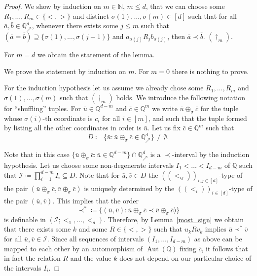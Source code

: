 \documentclass{amsart}
\theoremstyle{definition}
\theoremstyle{remark}
\numberwithin{equation}{section}
\newcommand{\aut}{\operatorname{Aut}}
\newcommand\qup[1]{\mathbb{Q}_\nearrow^{#1}}
\newcommand{\shuff}{\oplus}
\begin{document}
\begin{proof}
	We show by induction on $m \in {\mathbb N}$, $m \leq d$, that we can choose some $R_1,\dots,R_m \in \{<,>\}$ and distinct $\sigma(1),\dots,\sigma(m) \in [d]$ such that for all $\bar{a},\bar{b}\in \qup{d}$, whenever there exists some $j\leq m$ such that $(\bar{a}=\bar{b})\supseteq \{\sigma(1),\dots,\sigma(j-1)\}$ and $a_{\sigma(j)} R_j b_{\sigma(j)}$, then $\bar{a}\prec \bar{b}$. $(\dag_m)$.
	
	For $m=d$ we obtain the statement of the lemma.

	We prove the statement by induction on $m$. For $m=0$ there is nothing to prove.
	
	For the induction hypothesis let us assume we already chose some $R_1,\dots,R_m$ and $\sigma(1),\dots,\sigma(m)$ such that $(\dag_m)$ holds. We introduce the following notation for ``shuffling'' tuples. 
    For $\bar{u}\in \mathbb{Q}^{d-m}$ and $\bar{c}\in \mathbb{Q}^m$ we write $\bar{u}\shuff_{\sigma} \bar{c}$ for the tuple whose $\sigma(i)$-th coordinate is $c_i$ for all $i \in [m]$, and such that the tuple formed by listing all the other coordinates in order is $\bar{u}$. Let us fix $\bar{c}\in \mathbb{Q}^m$ such that $$D\coloneqq \{\bar{u}: \bar{u}\shuff_{\sigma} \bar{c}\in \qup{d}\}\neq \emptyset.$$

	Note that in this case $\{\bar{u}\shuff_{\sigma} \bar{c}: \bar{u}\in \mathbb{Q}^{d-m}\}\cap \qup{d}$ is a $\prec$-interval by the induction hypothesis. Let us choose some non-degenerate intervals $I_1<\dots<I_{d-m}$ of $\mathbb{Q}$ such that $\mathcal{I}\coloneqq \prod_{i=1}^{d-m}I_i\subseteq D$. Note that for $\bar{u},\bar{v}\in D$ the $((<_{ij}))_{i,j\in [d]}$-type of the pair $(\bar{u}\shuff_{\sigma} \bar{c}, \bar{v}\shuff_{\sigma} \bar{c})$ is uniquely determined by the $((<_i))_{i\in [d]}$-type of the pair $(\bar{u},\bar{v})$. This implies that the order $$\prec^*\coloneqq \{(\bar{u},\bar{v}): \bar{u}\shuff_{\sigma} \bar{c}\prec \bar{v}\shuff_{\sigma} \bar{c})\}$$ is definable in $(\mathcal{I};<_1,\dots,<_d)$. Therefore, by Lemma~\ref{most_sign} we obtain that there exists some $k$ and some $R\in \{<,>\}$ such that $u_kRv_k$ implies $\bar{u}\prec^*\bar{v}$ for all $\bar{u},\bar{v}\in \mathcal{I}$. Since all sequences of intervals $(I_1,\dots,I_{d-m})$ as above can be mapped to each other by an automorphism of $\aut(\mathbb{Q})$ fixing $\bar{c}$, it follows that in fact the {relation $R$ and the} value $k$ does not depend on our particular choice of the intervals $I_i$.
	

\end{proof}
\end{document}
